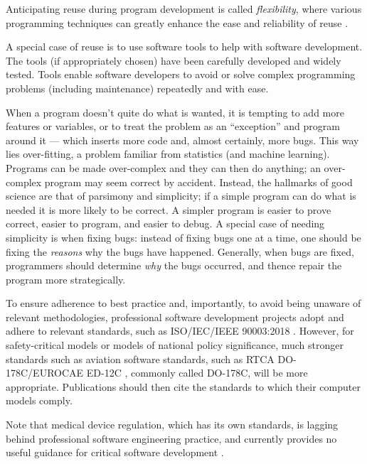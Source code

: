 \documentclass{article}
\begin{document}
Anticipating reuse during program development is called \emph{flexibility}, where various programming techniques can greatly enhance the ease and reliability of reuse \cite{flexibility}.

A special case of reuse is to use software tools to help with software development. The tools (if appropriately chosen) have been carefully developed and widely tested. Tools enable software developers to avoid or solve complex programming problems (including maintenance) repeatedly and with ease.

When a program doesn't quite do what is wanted, it is tempting to add more features or variables, or to treat the problem as an ``exception'' and program around it --- which inserts more code and, almost certainly, more bugs. This way lies over-fitting, a problem familiar from statistics (and machine learning). Programs can be made over-complex and they can then do anything; an over-complex program may seem correct by accident. Instead, the hallmarks of good science are that of parsimony and simplicity; if a simple program can do what is needed it is more likely to be correct. A simpler program is easier to prove correct, easier to program, and easier to debug. A special case of needing simplicity is when fixing bugs: instead of fixing bugs one at a time, one should be fixing the \emph{reasons\/} why the bugs have happened. Generally, when bugs are fixed, programmers should determine \emph{why\/} the bugs occurred, and thence repair the program more strategically.



To ensure adherence to best practice and, importantly, to avoid being unaware of relevant methodologies, professional software development projects adopt and adhere to relevant standards, such as ISO/IEC/IEEE 90003:2018 \cite{iso}. However, for safety-critical models or models of national policy significance, much stronger standards such as aviation software standards, such as RTCA DO-178C/EUROCAE ED-12C \cite{178C}, commonly called DO-178C, will be more appropriate. Publications should then cite the  standards to which their computer models comply. 

Note that medical device regulation, which has its own standards, is lagging behind professional software engineering practice, and currently provides no useful guidance for critical software development \cite{fixit}.
\end{document}

